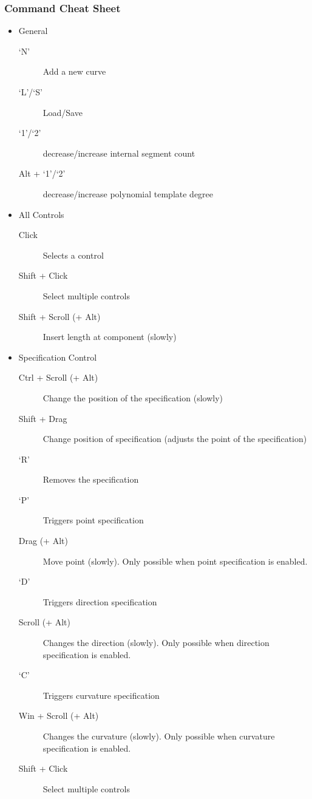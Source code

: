 \documentclass[a4paper]{article}
\begin{document}
				\subsubsection{Command Cheat Sheet}
					\begin{itemize}
						\item General
						\begin{description}
							\item[`N'] Add a new curve
							\item[`L'/`S'] Load/Save
							\item[`1'/`2'] decrease/increase internal segment count
							\item[Alt + `1'/`2'] decrease/increase polynomial template degree
						\end{description}
						\item All Controls
						\begin{description}
							\item[Click] Selects a control 
							\item[Shift + Click] Select multiple controls
							\item[Shift + Scroll (+ Alt)] Insert length at component (slowly)
						\end{description}
						\item Specification Control
						\begin{description}
							\item[Ctrl + Scroll (+ Alt)] Change the position of the specification (slowly)
							\item[Shift + Drag] Change position of specification (adjusts the point of the specification)
							\item[`R'] Removes the specification
							\item[`P'] Triggers point specification
							\item[Drag (+ Alt)] Move point (slowly). Only possible when point specification is enabled.
							\item[`D'] Triggers direction specification
							\item[Scroll (+ Alt)] Changes the direction (slowly). Only possible when direction specification is enabled.
							\item[`C'] Triggers curvature specification
							\item[Win + Scroll (+ Alt)] Changes the curvature (slowly). Only possible when curvature specification is enabled.
							\item[Shift + Click] Select multiple controls

\end{description}
\end{itemize}
\end{document}
